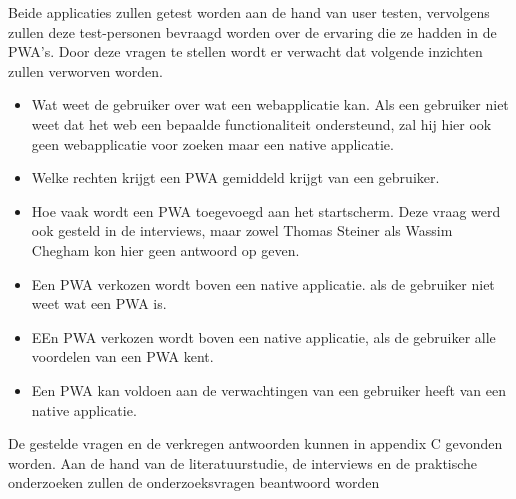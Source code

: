 Beide applicaties zullen getest worden aan de hand van user testen, vervolgens zullen deze test-personen bevraagd worden over de ervaring die ze hadden in de PWA's.
Door deze vragen te stellen wordt er verwacht dat volgende inzichten zullen verworven worden.
\begin{itemize}
	\item Wat weet de gebruiker over wat een webapplicatie kan. Als een gebruiker niet weet dat het web een bepaalde functionaliteit ondersteund, zal hij hier ook geen webapplicatie voor zoeken maar een native applicatie.
	\item Welke rechten krijgt een PWA gemiddeld krijgt van een gebruiker.
	\item Hoe vaak wordt een PWA toegevoegd aan het startscherm. Deze vraag werd ook gesteld in de interviews, maar zowel Thomas Steiner als Wassim Chegham kon hier geen antwoord op geven.
	\item Een PWA verkozen wordt boven een native applicatie. als de gebruiker niet weet wat een PWA is.
	\item EEn PWA verkozen wordt boven een native applicatie, als de gebruiker alle voordelen van een PWA kent.	
	\item Een PWA kan voldoen aan de verwachtingen van een gebruiker heeft van een native applicatie.
\end{itemize}

De gestelde vragen en de verkregen antwoorden kunnen in appendix C gevonden worden.
Aan de hand van de literatuurstudie, de interviews en de praktische onderzoeken zullen de onderzoeksvragen beantwoord worden

